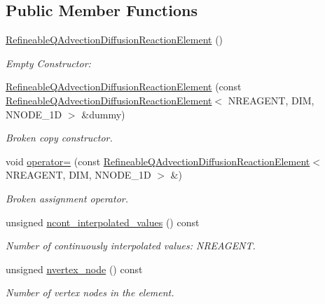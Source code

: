 \subsection*{Public Member Functions}
\begin{DoxyCompactItemize}
\item 
\hyperlink{classoomph_1_1RefineableQAdvectionDiffusionReactionElement_a8c0b1503b0217e5c2fba14038aa6ac56}{Refineable\+Q\+Advection\+Diffusion\+Reaction\+Element} ()
\begin{DoxyCompactList}\small\item\em Empty Constructor\+: \end{DoxyCompactList}\item 
\hyperlink{classoomph_1_1RefineableQAdvectionDiffusionReactionElement_ab29a65971bc16a71f6cd03386f836556}{Refineable\+Q\+Advection\+Diffusion\+Reaction\+Element} (const \hyperlink{classoomph_1_1RefineableQAdvectionDiffusionReactionElement}{Refineable\+Q\+Advection\+Diffusion\+Reaction\+Element}$<$ N\+R\+E\+A\+G\+E\+NT, D\+IM, N\+N\+O\+D\+E\+\_\+1D $>$ \&dummy)
\begin{DoxyCompactList}\small\item\em Broken copy constructor. \end{DoxyCompactList}\item 
void \hyperlink{classoomph_1_1RefineableQAdvectionDiffusionReactionElement_a418da5d129d6166811c85e2ba74f2a93}{operator=} (const \hyperlink{classoomph_1_1RefineableQAdvectionDiffusionReactionElement}{Refineable\+Q\+Advection\+Diffusion\+Reaction\+Element}$<$ N\+R\+E\+A\+G\+E\+NT, D\+IM, N\+N\+O\+D\+E\+\_\+1D $>$ \&)
\begin{DoxyCompactList}\small\item\em Broken assignment operator. \end{DoxyCompactList}\item 
unsigned \hyperlink{classoomph_1_1RefineableQAdvectionDiffusionReactionElement_a078b1a058535cff0b63576b58b1b3ea3}{ncont\+\_\+interpolated\+\_\+values} () const
\begin{DoxyCompactList}\small\item\em Number of continuously interpolated values\+: N\+R\+E\+A\+G\+E\+NT. \end{DoxyCompactList}\item 
unsigned \hyperlink{classoomph_1_1RefineableQAdvectionDiffusionReactionElement_a3acfe299d116cbac0fcb40ac619687da}{nvertex\+\_\+node} () const
\begin{DoxyCompactList}\small\item\em Number of vertex nodes in the element. \end{DoxyCompactList}\item 

\end{DoxyCompactItemize}

